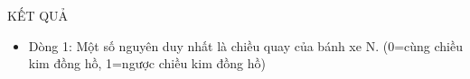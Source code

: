 KẾT QUẢ
\begin{itemize}
	\item     Dòng 1: Một số nguyên duy nhất là chiều quay của bánh xe N.         (0=cùng chiều kim đồng hồ, 1=ngược chiều kim đồng hồ)   
\end{itemize}